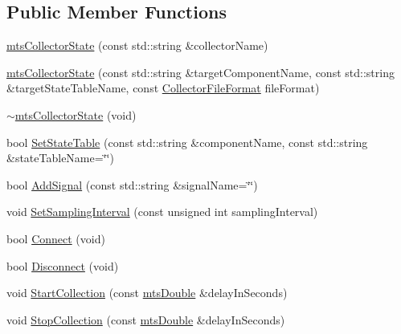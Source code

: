 \subsection*{Public Member Functions}
\begin{DoxyCompactItemize}
\item 
\hyperlink{classmts_collector_state_a34e1c33ed253cea0354e789c821ce68f}{mts\+Collector\+State} (const std\+::string \&collector\+Name)
\item 
\hyperlink{classmts_collector_state_a32fc978a0d303bad899e0f7c6927d41c}{mts\+Collector\+State} (const std\+::string \&target\+Component\+Name, const std\+::string \&target\+State\+Table\+Name, const \hyperlink{group__cisst_multi_task_gaa228bed8144053d0bfa316f9ac9d0901}{Collector\+File\+Format} file\+Format)
\item 
\hyperlink{classmts_collector_state_a8cf49acf351f722426e9702661041d7e}{$\sim$mts\+Collector\+State} (void)
\item 
bool \hyperlink{classmts_collector_state_a984a05c6362c5e9e9bf87da923f67893}{Set\+State\+Table} (const std\+::string \&component\+Name, const std\+::string \&state\+Table\+Name=\char`\"{}\char`\"{})
\item 
bool \hyperlink{classmts_collector_state_ad040a83bd440b0b9b26f513a418cdad9}{Add\+Signal} (const std\+::string \&signal\+Name=\char`\"{}\char`\"{})
\item 
void \hyperlink{classmts_collector_state_a167a95911da734754db0abeeacaa15cc}{Set\+Sampling\+Interval} (const unsigned int sampling\+Interval)
\item 
bool \hyperlink{classmts_collector_state_aff201d6644d0b997961833e9ef025343}{Connect} (void)
\item 
bool \hyperlink{classmts_collector_state_ac1d62769aedb2fab6cec2eca161eb06c}{Disconnect} (void)
\end{DoxyCompactItemize}
{\bf }\par
\begin{DoxyCompactItemize}
\item 
void \hyperlink{classmts_collector_state_a4337bf2b019fb0516abfe5faadbac5f5}{Start\+Collection} (const \hyperlink{mts_generic_object_proxy_8h_a31e76b0190a8d3f9838626cd7b47bd75}{mts\+Double} \&delay\+In\+Seconds)
\item 
void \hyperlink{classmts_collector_state_a8da41d4b23bbb42f9f74ee32fecf36ec}{Stop\+Collection} (const \hyperlink{mts_generic_object_proxy_8h_a31e76b0190a8d3f9838626cd7b47bd75}{mts\+Double} \&delay\+In\+Seconds)
\end{DoxyCompactItemize}

